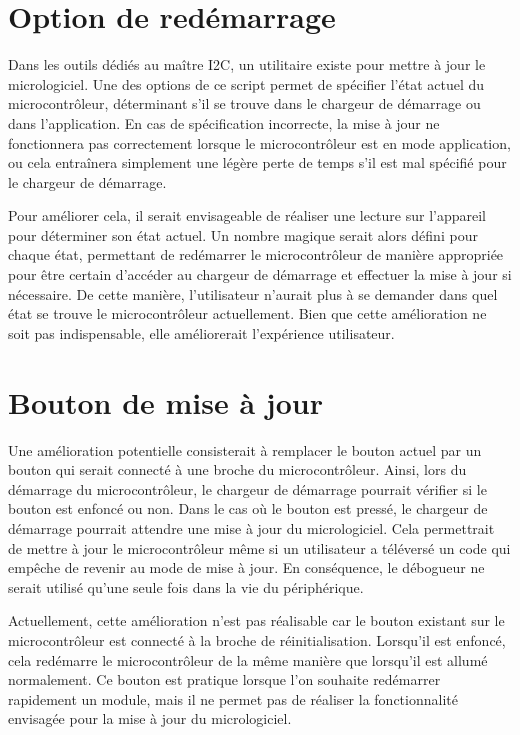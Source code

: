 \section{Option de redémarrage}

Dans les outils dédiés au maître I2C, un utilitaire existe pour mettre à jour le micrologiciel.
Une des options de ce script permet de spécifier l'état actuel du microcontrôleur, déterminant s'il se trouve dans le chargeur de démarrage ou dans l'application.
En cas de spécification incorrecte, la mise à jour ne fonctionnera pas correctement lorsque le microcontrôleur est en mode application, ou cela entraînera simplement une légère perte de temps s'il est mal spécifié pour le chargeur de démarrage.

Pour améliorer cela, il serait envisageable de réaliser une lecture sur l'appareil pour déterminer son état actuel.
Un nombre magique serait alors défini pour chaque état, permettant de redémarrer le microcontrôleur de manière appropriée pour être certain d'accéder au chargeur de démarrage et effectuer la mise à jour si nécessaire.
De cette manière, l'utilisateur n'aurait plus à se demander dans quel état se trouve le microcontrôleur actuellement.
Bien que cette amélioration ne soit pas indispensable, elle améliorerait l'expérience utilisateur.

\section{Bouton de mise à jour}

Une amélioration potentielle consisterait à remplacer le bouton actuel par un bouton qui serait connecté à une broche du microcontrôleur. Ainsi, lors du démarrage du microcontrôleur, le chargeur de démarrage pourrait vérifier si le bouton est enfoncé ou non.
Dans le cas où le bouton est pressé, le chargeur de démarrage pourrait attendre une mise à jour du micrologiciel.
Cela permettrait de mettre à jour le microcontrôleur même si un utilisateur a téléversé un code qui empêche de revenir au mode de mise à jour.
En conséquence, le débogueur ne serait utilisé qu'une seule fois dans la vie du périphérique.

Actuellement, cette amélioration n'est pas réalisable car le bouton existant sur le microcontrôleur est connecté à la broche de réinitialisation.
Lorsqu'il est enfoncé, cela redémarre le microcontrôleur de la même manière que lorsqu'il est allumé normalement.
Ce bouton est pratique lorsque l'on souhaite redémarrer rapidement un module, mais il ne permet pas de réaliser la fonctionnalité envisagée pour la mise à jour du micrologiciel.

